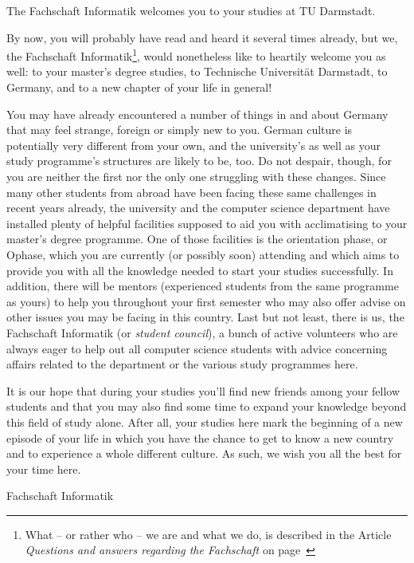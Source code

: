 {The Fachschaft Informatik welcomes you to your studies at TU Darmstadt.}{
    By now, you will probably have read and heard it several times already, but we, the Fachschaft Informatik\footnote{What -- or rather who -- we are and what we do, is described in the Article \textit{Questions and answers regarding the Fachschaft} on page~\pageref{FSarticle}}, would nonetheless like to heartily welcome you as well: to your master's degree studies, to Technische Universität Darmstadt, to Germany, and to a new chapter of your life in general!

    You may have already encountered a number of things in and about Germany that may feel strange, foreign or simply new to you.
    German culture is potentially very different from your own, and the university's as well as your study programme's structures are likely to be, too.
    Do not despair, though, for you are neither the first nor the only one struggling with these changes.
    Since many other students from abroad have been facing these same challenges in recent years already, the university and the computer science department have installed plenty of helpful facilities supposed to aid you with acclimatising to your master's degree programme.
    One of those facilities is the orientation phase, or Ophase, which you are currently (or possibly soon) attending and which aims to provide you with all the knowledge needed to start your studies successfully.
    In addition, there will be mentors (experienced students from the same programme as yours) to help you throughout your first semester who may also offer advise on other issues you may be facing in this country.
    Last but not least, there is us, the Fachschaft Informatik (or \textit{student council}), a bunch of active volunteers who are always eager to help out all computer science students with advice concerning affairs related to the department or the various study programmes here.

    It is our hope that during your studies you'll find new friends among your fellow students and that you may also find some time to expand your knowledge beyond this field of study alone.
    After all, your studies here mark the beginning of a new episode of your life in which you have the chance to get to know a new country and to experience a whole different culture.
    As such, we wish you all the best for your time here.
}
{Fachschaft Informatik}

\noindent
{}


